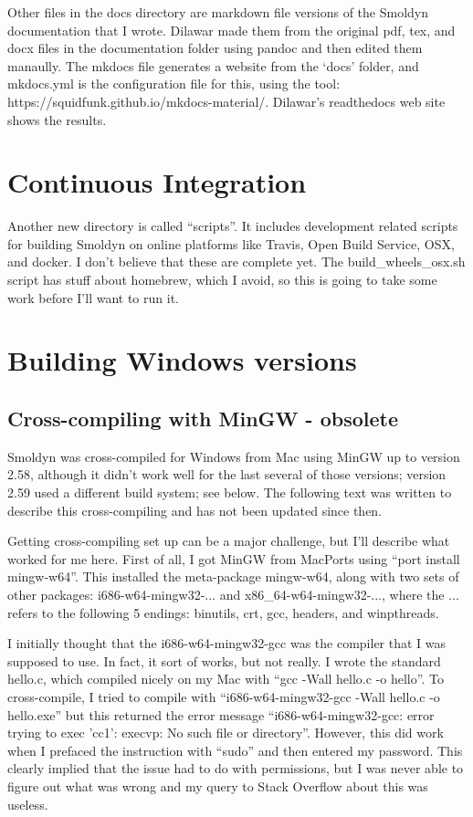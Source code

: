 \documentclass {book}
\begin{document}
Other files in the docs directory are markdown file versions of the Smoldyn documentation that I wrote. Dilawar made them from the original pdf, tex, and docx files in the documentation folder using pandoc and then edited them manaully. The mkdocs file generates a website from the `docs' folder, and mkdocs.yml is the configuration file for this, using the tool: https://squidfunk.github.io/mkdocs-material/. Dilawar's readthedocs web site shows the results.

\section{Continuous Integration}

Another new directory is called ``scripts''. It includes development related scripts for building Smoldyn on online platforms like Travis, Open Build Service, OSX, and docker. I don't believe that these are complete yet. The build\_wheels\_osx.sh script has stuff about homebrew, which I avoid, so this is going to take some work before I'll want to run it.



\section{Building Windows versions}

\subsection{Cross-compiling with MinGW - obsolete}

Smoldyn was cross-compiled for Windows from Mac using MinGW up to version 2.58, although it didn't work well for the last several of those versions; version 2.59 used a different build system; see below. The following text was written to describe this cross-compiling and has not been updated since then.

Getting cross-compiling set up can be a major challenge, but I'll describe what worked for me here. First of all, I got MinGW from MacPorts using ``port install mingw-w64''. This installed the meta-package mingw-w64, along with two sets of other packages: i686-w64-mingw32-... and x86\_64-w64-mingw32-..., where the ... refers to the following 5 endings: binutils, crt, gcc, headers, and winpthreads.

I initially thought that the i686-w64-mingw32-gcc was the compiler that I was supposed to use. In fact, it sort of works, but not really. I wrote the standard hello.c, which compiled nicely on my Mac with ``gcc -Wall hello.c -o hello''. To cross-compile, I tried to compile with ``i686-w64-mingw32-gcc -Wall hello.c -o hello.exe'' but this returned the error message ``i686-w64-mingw32-gcc: error trying to exec 'cc1': execvp: No such file or directory''. However, this did work when I prefaced the instruction with ``sudo'' and then entered my password. This clearly implied that the issue had to do with permissions, but I was never able to figure out what was wrong and my query to Stack Overflow about this was useless.
\end{document}
